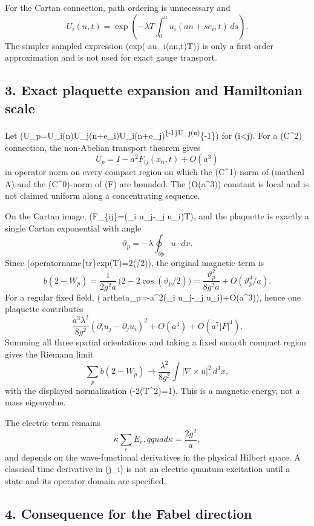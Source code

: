 For the Cartan connection, path ordering is unnecessary and \[
U_i(n,t)=\exp\left(-\lambda T\int_0^a u_i(an+s e_i,t)\,ds\right).
\] The simpler sampled expression (exp(-a\lambda u\_i(an,t)T)) is only a
first-order approximation and is not used for exact gauge transport.

\subsection{3. Exact plaquette expansion and Hamiltonian
scale}\label{fabel-current-to-lattice-audit-md-exact-plaquette-expansion-and-hamiltonian-scale}

Let
(U\_p=U\_i(n)U\_j(n+e\_i)U\_i(n+e\_j)\textsuperscript{\{-1\}U\_j(n)}\{-1\})
for (i\textless j). For a (C\^{}2) connection, the non-Abelian transport
theorem gives \[
U_p=I-a^2F_{ij}(x_n,t)+O(a^3)
\] in operator norm on every compact region on which the (C\^{}1)-norm
of (mathcal A) and the (C\^{}0)-norm of (F) are bounded. The (O(a\^{}3))
constant is local and is not claimed uniform along a concentrating
sequence.

On the Cartan image, (F\_\{ij\}=\lambda(\partial\_i u\_j-\partial\_j
u\_i)T), and the plaquette is exactly a single Cartan exponential with
angle \[
\vartheta_p= -\lambda\oint_{\partial p}u\cdot dx.
\] Since (operatorname\{tr\}exp(\vartheta T)=2\cos(\vartheta/2)), the
original magnetic term is \[
b(2-W_p)=\frac1{2g^2a}\,\bigl(2-2\cos(\vartheta_p/2)\bigr)
 =\frac{\vartheta_p^2}{8g^2a}+O(\vartheta_p^4/a).
\] For a regular fixed field, (artheta\_p=-a\^{}2\lambda(\partial\_i
u\_j-\partial\_j u\_i)+O(a\^{}3)), hence one plaquette contributes \[
\frac{a^3\lambda^2}{8g^2}(\partial_i u_j-\partial_j u_i)^2+O(a^4)+O(a^7|F|^4).
\] Summing all three spatial orientations and taking a fixed smooth
compact region gives the Riemann limit \[
\sum_{p}b(2-W_p)\longrightarrow
\frac{\lambda^2}{8g^2}\int |\nabla\times u|^2\,d^3x,
\] with the displayed normalization (-2(T\^{}2)=1).
This is a magnetic energy, not a mass eigenvalue.

The electric term remains \[
\kappa\sum_eE_e,qquad \kappa=\frac{2g^2}{a},
\] and depends on the wave-functional derivatives in the physical
Hilbert space. A classical time derivative in (j\_i) is not an electric
quantum excitation until a state and its operator domain are specified.

\subsection{4. Consequence for the Fabel
direction}\label{fabel-current-to-lattice-audit-md-consequence-for-the-fabel-direction}


